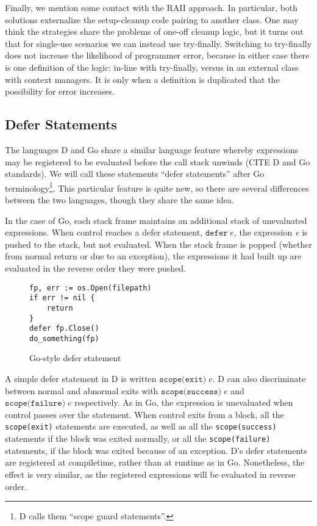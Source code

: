 \documentclass[11pt]{article}
\newcommand{\maybePage}{\newpage}
\begin{document}
Finally, we mention some contact with the RAII approach.
In particular, both solutions externalize the setup-cleanup code pairing to another class.
One may think the strategies share the problems of one-off cleanup logic, but it turns out that for single-use scenarios we can instead use try-finally.
Switching to try-finally does not increase the likelihood of programmer error, because in either case there is one definition of the logic: in-line with try-finally, versus in an external class with context managers.
It is only when a definition is duplicated that the possibility for error increases.


\maybePage
\subsection{Defer Statements}
\label{defer}

The languages D and Go share a similar language feature whereby expressions may be registered to be evaluated before the call stack unwinds (CITE D and Go standards). We will call these statements ``defer statements'' after Go terminology\footnote{D calls them ``scope guard statements''.}. This particular feature is quite new, so there are several differences between the two languages, though they share the same idea.

In the case of Go, each stack frame maintains an additional stack of unevaluated expressions. When control reaches a defer statement, $\texttt{defer}\;e$, the expression \textit{e} is pushed to the stack, but not evaluated. When the stack frame is popped (whether from normal return or due to an exception), the expressions it had built up are evaluated in the reverse order they were pushed.

\begin{figure}[h]
\caption{Go-style defer statement}
\label{goDeferStatement}
\begin{verbatim}
fp, err := os.Open(filepath)
if err != nil {
    return
}
defer fp.Close()
do_something(fp)
\end{verbatim}
\end{figure}

A simple defer statement in D is written $\texttt{scope(exit)}\;e$.
D can also discriminate between normal and abnormal exits with $\texttt{scope(success)}\;e$ and $\texttt{scope(failure)}\;e$ respectively.
As in Go, the expression is unevaluated when control passes over the statement.
When control exits from a block, all the \texttt{scope(exit)} statements are executed, as well as all the \texttt{scope(success)} statements if the block was exited normally, or all the \texttt{scope(failure)} statements, if the block was exited because of an exception.
D's defer statements are registered at compiletime, rather than at runtime as in Go.
Nonetheless, the effect is very similar, as the registered expressions will be evaluated in reverse order.
\end{document}
